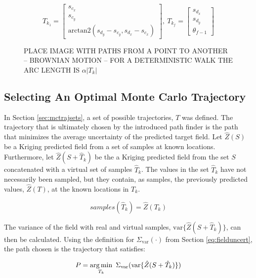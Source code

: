 \begin{equation}
	T_{k_1} = \begin{bmatrix}
		s_{c_x} \\
		s_{c_y} \\
		\text{arctan2}(s_{d_y} - s_{c_y}, s_{d_x} - s_{c_x})
	\end{bmatrix},\ 
	T_{k_f} = \begin{bmatrix}
		s_{d_x} \\
		s_{d_y} \\
		\theta_{f-1}
	\end{bmatrix}
\end{equation}

\begin{figure}
	\centering
	\caption{PLACE IMAGE WITH PATHS FROM A POINT TO ANOTHER -- BROWNIAN MOTION -- FOR A DETERMINISTIC WALK THE ARC LENGTH IS $\alpha |T_k|$}
\end{figure}

\subsection{Selecting An Optimal Monte Carlo Trajectory} \label{sec:mcselbesttraj}
In Section \ref{sec:mctrajsets}, a set of possible trajectories, $T$ was defined. The trajectory that is ultimately chosen by the introduced path finder is the path that minimizes the average uncertainty of the predicted target field.
Let $\hat{Z}(S)$ be a Kriging predicted field from a set of samples at known locations. Furthermore, let $\hat{Z}(S+\hat{T}_k)$ be the a Kriging predicted field from the set $S$ concatenated with a virtual set of samples $\hat{T}_k$. The values in the set $\hat{T}_k$ have not necessarily been sampled, but they contain, as samples, the previously predicted values, $\hat{Z}(T)$, at the known locations in $T_k$.

\begin{equation}
	samples(\hat{T}_k) = \hat{Z}(T_k)
\end{equation}

The variance of the field with real and virtual samples, $\text{var}\{\hat{Z}(S+\hat{T}_k)\}$, can then be calculated. Using the definition for $\Sigma_{\text{var}}(\cdot)$ from Section \ref{eq:fielduncert}, the path chosen is the trajectory that satisfies:

\begin{equation}
	\label{eq:mcfoundpath}
	P = \argmin_{T_k}\ \Sigma_{\text{var}}(\text{var}\{\hat{Z}(S+\hat{T}_k)\})
\end{equation}

